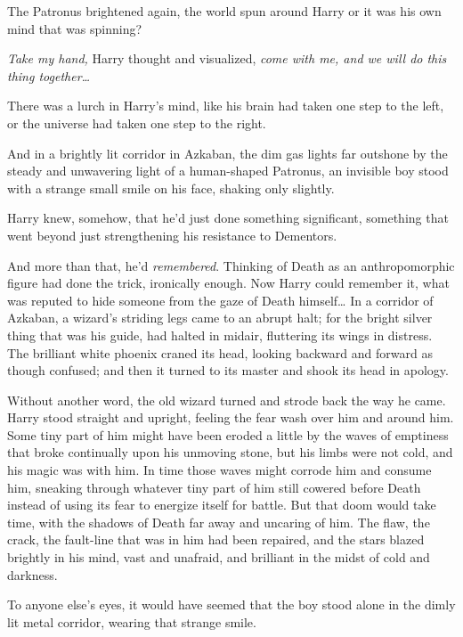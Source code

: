 The Patronus brightened again, the world spun around Harry or it was his own 
mind that was spinning?

\emph{Take my hand,} Harry thought and visualized, \emph{come with me, and we 
will do this thing together{\ldots}\\
}

There was a lurch in Harry's mind, like his brain had taken one step to the 
left, or the universe had taken one step to the right.

And in a brightly lit corridor in Azkaban, the dim gas lights far outshone by 
the steady and unwavering light of a human-shaped Patronus, an invisible boy 
stood with a strange small smile on his face, shaking only slightly.

Harry knew, somehow, that he'd just done something significant, something that 
went beyond just strengthening his resistance to Dementors.

And more than that, he'd \emph{remembered}. Thinking of Death as an 
anthropomorphic figure had done the trick, ironically enough. Now Harry could 
remember it, what was reputed to hide someone from the gaze of Death 
himself{\ldots}
\sbreak
In a corridor of Azkaban, a wizard's striding legs came to an abrupt halt; for 
the bright silver thing that was his guide, had halted in midair, fluttering 
its wings in distress. The brilliant white phoenix craned its head, looking 
backward and forward as though confused; and then it turned to its master and 
shook its head in apology.

Without another word, the old wizard turned and strode back the way he came.
\sbreak
Harry stood straight and upright, feeling the fear wash over him and around 
him. Some tiny part of him might have been eroded a little by the waves of 
emptiness that broke continually upon his unmoving stone, but his limbs were 
not cold, and his magic was with him. In time those waves might corrode him and 
consume him, sneaking through whatever tiny part of him still cowered before 
Death instead of using its fear to energize itself for battle. But that doom 
would take time, with the shadows of Death far away and uncaring of him. The 
flaw, the crack, the fault-line that was in him had been repaired, and the 
stars blazed brightly in his mind, vast and unafraid, and brilliant in the 
midst of cold and darkness.

To anyone else's eyes, it would have seemed that the boy stood alone in the 
dimly lit metal corridor, wearing that strange smile.

